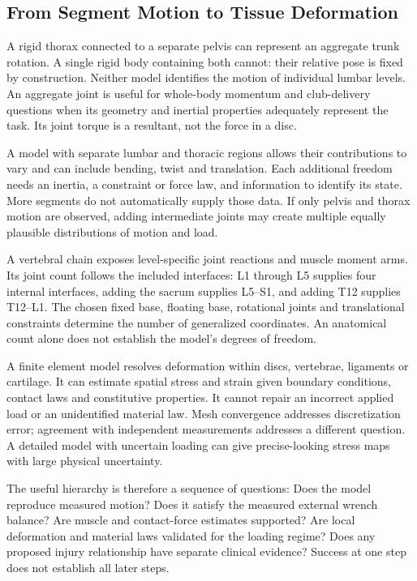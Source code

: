 \subsection{From Segment Motion to Tissue Deformation}
A rigid thorax connected to a separate pelvis can represent an aggregate trunk rotation. A single rigid body containing both cannot: their relative pose is fixed by construction. Neither model identifies the motion of individual lumbar levels. An aggregate joint is useful for whole-body momentum and club-delivery questions when its geometry and inertial properties adequately represent the task. Its joint torque is a resultant, not the force in a disc.

A model with separate lumbar and thoracic regions allows their contributions to vary and can include bending, twist and translation. Each additional freedom needs an inertia, a constraint or force law, and information to identify its state. More segments do not automatically supply those data. If only pelvis and thorax motion are observed, adding intermediate joints may create multiple equally plausible distributions of motion and load.

A vertebral chain exposes level-specific joint reactions and muscle moment arms. Its joint count follows the included interfaces: L1 through L5 supplies four internal interfaces, adding the sacrum supplies L5--S1, and adding T12 supplies T12--L1. The chosen fixed base, floating base, rotational joints and translational constraints determine the number of generalized coordinates. An anatomical count alone does not establish the model's degrees of freedom.

A finite element model resolves deformation within discs, vertebrae, ligaments or cartilage. It can estimate spatial stress and strain given boundary conditions, contact laws and constitutive properties. It cannot repair an incorrect applied load or an unidentified material law. Mesh convergence addresses discretization error; agreement with independent measurements addresses a different question. A detailed model with uncertain loading can give precise-looking stress maps with large physical uncertainty.

The useful hierarchy is therefore a sequence of questions: Does the model reproduce measured motion? Does it satisfy the measured external wrench balance? Are muscle and contact-force estimates supported? Are local deformation and material laws validated for the loading regime? Does any proposed injury relationship have separate clinical evidence? Success at one step does not establish all later steps.


